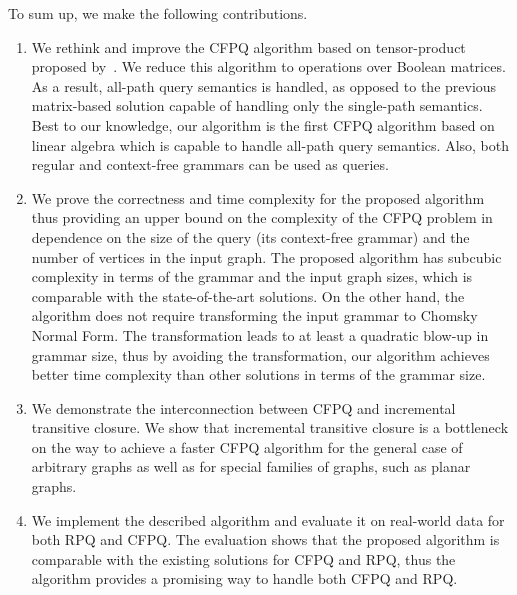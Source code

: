 To sum up, we make the following contributions.
\begin{enumerate}
	\item We rethink and improve the CFPQ algorithm based on tensor-product proposed by~\cite{10.1007/978-3-030-54832-2_6}.
	We reduce this algorithm to operations over Boolean matrices.
	As a result, all-path query semantics is handled, as opposed to the previous matrix-based solution capable of handling only the single-path semantics.
	Best to our knowledge, our algorithm is the first CFPQ algorithm based on linear algebra which is capable to handle all-path query semantics.
	Also, both regular and context-free grammars can be used as queries.
	\item
	We prove the correctness and time complexity for the proposed algorithm thus providing an upper bound on the complexity of the CFPQ problem in dependence on the size of the query (its context-free grammar) and the number of vertices in the input graph.
	The proposed algorithm has subcubic complexity in terms of the grammar and the input graph sizes, which is comparable with the state-of-the-art solutions.
	On the other hand, the algorithm does not require transforming the input grammar to Chomsky Normal Form.
	The transformation leads to at least a quadratic blow-up in grammar size, thus by avoiding the transformation, our algorithm achieves better time complexity   than other solutions in terms of the grammar size.
	\item We demonstrate the interconnection between CFPQ and incremental transitive closure.
	We show that incremental transitive closure is a bottleneck on the way to achieve a faster CFPQ algorithm for the general case of arbitrary graphs as well as for special families of graphs, such as planar graphs.
	\item We implement the described algorithm and evaluate it on real-world data for both RPQ and CFPQ.
	The evaluation shows that the proposed algorithm is comparable with the existing solutions for CFPQ and RPQ, thus the algorithm provides a promising way to handle both CFPQ and RPQ.
\end{enumerate}